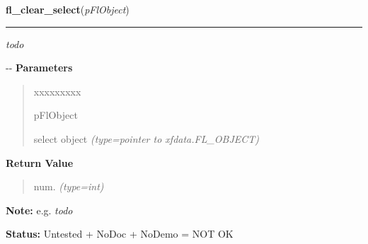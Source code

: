     \label{xformslib:flselect:fl_clear_select}

    \vspace{0.5ex}

\hspace{.8\funcindent}\begin{boxedminipage}{\funcwidth}

    \raggedright \textbf{fl\_clear\_select}(\textit{pFlObject})

    \vspace{-1.5ex}

    \rule{\textwidth}{0.5\fboxrule}
\setlength{\parskip}{2ex}

\emph{todo}

-{}-
\setlength{\parskip}{1ex}
      \textbf{Parameters}
      \vspace{-1ex}

      \begin{quote}
        \begin{Ventry}{xxxxxxxxx}

          \item[pFlObject]


select object
            {\it (type=pointer to xfdata.FL\_OBJECT)}

        \end{Ventry}

      \end{quote}

      \textbf{Return Value}
    \vspace{-1ex}

      \begin{quote}

num.
      {\it (type=int)}

      \end{quote}

\textbf{Note:} 
e.g. \emph{todo}


\textbf{Status:} 
Untested + NoDoc + NoDemo = NOT OK


    \end{boxedminipage}

    \label{xformslib:flselect:fl_add_select_items}

    \vspace{0.5ex}


